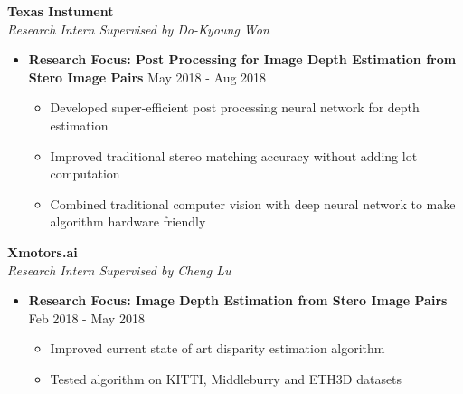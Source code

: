 \documentclass[10pt]{article}
\newenvironment{outerlist}[1][\enskip\textbullet]%
        {\begin{itemize}[#1,leftmargin=*]}{\end{itemize}%
         \vspace{-1.2\baselineskip}}
\newenvironment{innerlist}[1][\enskip\textbullet]%
        {\begin{itemize}[#1,leftmargin=*,parsep=0pt,itemsep=0pt,topsep=0pt,partopsep=0pt]}
        {\end{itemize}}
\begin{document}
\textbf{Texas Instument } \\
\emph{Research Intern Supervised by Do-Kyoung Won}
\begin{outerlist}
\vspace{-.1in}
\item[] \textbf{Research Focus: Post Processing for Image Depth Estimation from Stero Image Pairs} \hfill {May 2018 - Aug 2018}
        \begin{innerlist}
\vspace{-.05in}
        \item Developed super-efficient post processing neural network for depth estimation
        \item Improved traditional stereo matching accuracy without adding lot computation
        \item Combined traditional computer vision with deep neural network to make algorithm hardware friendly
         
	
        \end{innerlist}
\vspace{.2in}
\end{outerlist}


\textbf{Xmotors.ai } \\
\emph{Research Intern Supervised by Cheng Lu}
\begin{outerlist}
\vspace{-.1in}
\item[] \textbf{Research Focus: Image Depth Estimation from Stero Image Pairs} \hfill {Feb 2018 - May  2018}
        \begin{innerlist}
\vspace{-.05in}
        \item Improved current state of art disparity estimation algorithm
	\item Tested algorithm on KITTI, Middleburry and ETH3D datasets
	
        \end{innerlist}
\vspace{.2in}
\end{outerlist}
\end{document}
